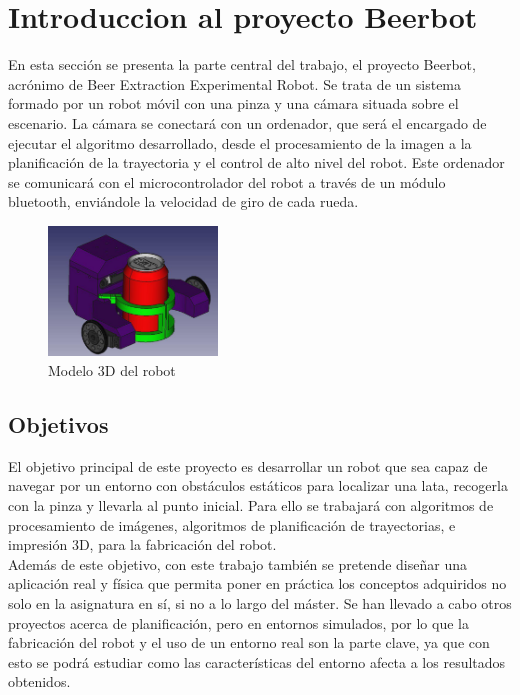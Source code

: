 \section{Introduccion al proyecto Beerbot}
\label{introduccion_desarrollo}

En esta sección se presenta la parte central del trabajo, el proyecto Beerbot, acrónimo de Beer Extraction Experimental Robot. Se trata de un sistema formado por un robot móvil con una pinza y una cámara situada sobre el escenario. La cámara se conectará con un ordenador, que será el encargado de ejecutar el algoritmo desarrollado, desde el procesamiento de la imagen a la planificación de la trayectoria y el control de alto nivel del robot. Este ordenador se comunicará con el microcontrolador del robot a través de un módulo bluetooth, enviándole la velocidad de giro de cada rueda.\\

\begin{figure}[H]
        \centering
        \includegraphics[width=0.4\textwidth]{images/robot.jpg}
        \caption{Modelo 3D del robot}
        \label{fig:robot}
\end{figure} 

\subsection{Objetivos}

El objetivo principal de este proyecto es desarrollar un robot que sea capaz de navegar por un entorno con obstáculos estáticos para localizar una lata, recogerla con la pinza y llevarla al punto inicial. Para ello se trabajará con algoritmos de procesamiento de imágenes, algoritmos de planificación de trayectorias, e impresión 3D, para la fabricación del robot.\\

Además de este objetivo, con este trabajo también se pretende diseñar una aplicación real y física que permita poner en práctica los conceptos adquiridos no solo en la asignatura en sí, si no a lo largo del máster. Se han llevado a cabo otros proyectos acerca de planificación, pero en entornos simulados, por lo que la fabricación del robot y el uso de un entorno real son la parte clave, ya que con esto se podrá estudiar como las características del entorno afecta a los resultados obtenidos.\\
 
